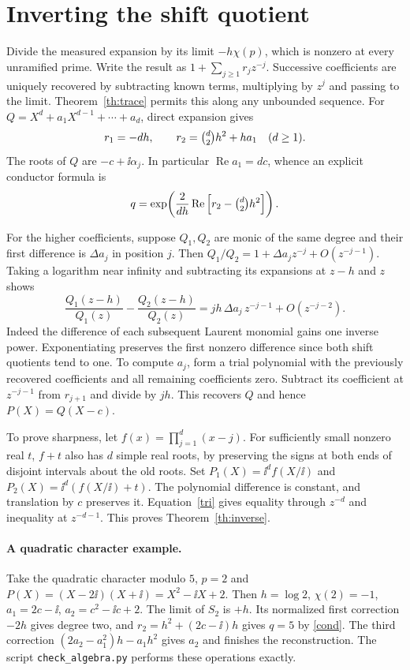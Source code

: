\documentclass[11pt,letterpaper]{article}
\newcommand{\rpart}{\operatorname{Re}}\newcommand{\ipart}{\operatorname{Im}}
\begin{document}
\section{Inverting the shift quotient}
Divide the measured expansion by its limit $-h\chi(p)$, which is
nonzero at every unramified prime. Write the result as
$1+\sum_{j\ge1}r_jz^{-j}$. Successive coefficients are uniquely recovered
by subtracting known terms, multiplying by $z^j$ and passing to the
limit. Theorem~\ref{th:trace} permits this along any unbounded sequence.
For $Q=X^d+a_1X^{d-1}+\cdots+a_d$, direct expansion gives
\begin{equation}\label{jet}
 r_1=-dh,\qquad r_2=\tbinom d2 h^2+h a_1\quad(d\ge1).
\end{equation}
The roots of $Q$ are $-c+\ii\alpha_j$. In particular
$\rpart a_1=dc$, whence an explicit conductor formula is
\begin{equation}\label{cond}
 q=\exp\!\left(\frac{2}{dh}\rpart\left[r_2-\tbinom d2 h^2\right]\right).
\end{equation}

For the higher coefficients, suppose $Q_1,Q_2$ are monic of the same
degree and their first difference is $\Delta a_j$ in position $j$.
Then $Q_1/Q_2=1+\Delta a_j z^{-j}+O(z^{-j-1})$. Taking a logarithm
near infinity and subtracting its expansions at $z-h$ and $z$ shows
\begin{equation}\label{tri}
 \frac{Q_1(z-h)}{Q_1(z)}-\frac{Q_2(z-h)}{Q_2(z)}
       =jh\,\Delta a_j\,z^{-j-1}+O(z^{-j-2}).
\end{equation}
Indeed the difference of each subsequent Laurent monomial gains one
inverse power. Exponentiating preserves the first nonzero difference
since both shift quotients tend to one. To compute $a_j$, form a trial
polynomial with the previously recovered coefficients and all remaining
coefficients zero. Subtract its coefficient at $z^{-j-1}$ from $r_{j+1}$
and divide by $jh$. This recovers $Q$ and hence $P(X)=Q(X-c)$.

To prove sharpness, let $f(x)=\prod_{j=1}^d(x-j)$. For sufficiently small
nonzero real $t$, $f+t$ also has $d$ simple real roots, by preserving the
signs at both ends of disjoint intervals about the old roots. Set
$P_1(X)=\ii^d f(X/\ii)$ and $P_2(X)=\ii^d(f(X/\ii)+t)$.
The polynomial difference is constant, and translation by $c$ preserves it.
Equation~\eqref{tri} gives equality through $z^{-d}$ and inequality
at $z^{-d-1}$. This proves Theorem~\ref{th:inverse}.

\paragraph{A quadratic character example.}
Take the quadratic character modulo $5$, $p=2$ and
$P(X)=(X-2\ii)(X+\ii)=X^2-\ii X+2$. Then $h=\log 2$,
$\chi(2)=-1$, $a_1=2c-\ii$, $a_2=c^2-\ii c+2$. The limit of $S_2$
is $+h$. Its normalized first correction $-2h$ gives degree two, and
$r_2=h^2+(2c-\ii)h$ gives $q=5$ by \eqref{cond}. The third correction
$(2a_2-a_1^2)h-a_1h^2$ gives $a_2$ and finishes the reconstruction.
The script \texttt{check\_algebra.py} performs these operations exactly.
\end{document}
